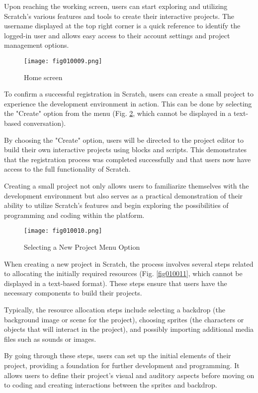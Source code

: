 Upon reaching the working screen, users can start exploring and utilizing Scratch's various features and tools to create their interactive projects. The username displayed at the top right corner is a quick reference to identify the logged-in user and allows easy access to their account settings and project management options.

\begin{figure}[H]
   \centering
   \texttt{[image: fig010009.png]}
   \caption{Home screen}
\label{fig010009}
\end{figure}

To confirm a successful registration in Scratch, users can create a small project to experience the development environment in action. This can be done by selecting the "Create" option from the menu (Fig. \ref{fig010010}, which cannot be displayed in a text-based conversation).

By choosing the "Create" option, users will be directed to the project editor to build their own interactive projects using blocks and scripts. This demonstrates that the registration process was completed successfully and that users now have access to the full functionality of Scratch.

Creating a small project not only allows users to familiarize themselves with the development environment but also serves as a practical demonstration of their ability to utilize Scratch's features and begin exploring the possibilities of programming and coding within the platform.

\begin{figure}[H]
   \centering
   \texttt{[image: fig010010.png]}
   \caption{Selecting a New Project Menu Option}
\label{fig010010}
\end{figure}

When creating a new project in Scratch, the process involves several steps related to allocating the initially required resources (Fig. \ref{fig010011}, which cannot be displayed in a text-based format). These steps ensure that users have the necessary components to build their projects.

Typically, the resource allocation steps include selecting a backdrop (the background image or scene for the project), choosing sprites (the characters or objects that will interact in the project), and possibly importing additional media files such as sounds or images.

By going through these steps, users can set up the initial elements of their project, providing a foundation for further development and programming. It allows users to define their project's visual and auditory aspects before moving on to coding and creating interactions between the sprites and backdrop.

